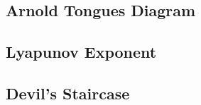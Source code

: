 \subsection{Arnold Tongues Diagram}


\subsection{Lyapunov Exponent}


\subsection{Devil's Staircase}







